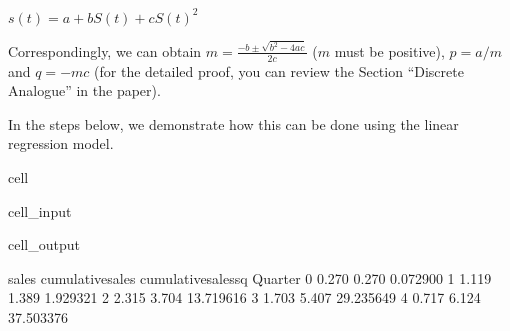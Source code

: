\documentclass[letterpaper,10pt,english]{jupyterBook}
\begin{document}
\sphinxAtStartPar
\(s(t) = a + bS(t) + cS(t)^2\)

\sphinxAtStartPar
Correspondingly, we can obtain \(m = \frac{-b \pm \sqrt{b^2-4ac}}{2c}\) (\(m\) must be positive), \(p = a/m\) and \(q = -mc\) (for the detailed proof, you can review the Section “Discrete Analogue” in the paper).

\sphinxAtStartPar
In the steps below, we demonstrate how this can be done using the linear regression model.

\begin{sphinxuseclass}{cell}\begin{sphinxVerbatimInput}

\begin{sphinxuseclass}{cell_input}
\begin{sphinxVerbatim}[commandchars=\\\{\}]
  

\PYG{p}{[}\PYG{p}{]}  \PYG{p}{[}\PYG{p}{]}
\PYG{p}{[}\PYG{p}{]}  \PYG{p}{[}\PYG{p}{]}
\PYG{p}{[}\PYG{p}{]}  \PYG{p}{[}    \PYG{p}{[}\PYG{p}{]}\PYG{p}{]}
\end{sphinxVerbatim}

\end{sphinxuseclass}\end{sphinxVerbatimInput}
\begin{sphinxVerbatimOutput}

\begin{sphinxuseclass}{cell_output}
\begin{sphinxVerbatim}[commandchars=\\\{\}]
         sales  cumulative\PYGZus{}sales  cumulative\PYGZus{}sales\PYGZus{}sq
Quarter                                              
0        0.270             0.270             0.072900
1        1.119             1.389             1.929321
2        2.315             3.704            13.719616
3        1.703             5.407            29.235649
4        0.717             6.124            37.503376
\end{sphinxVerbatim}

\end{sphinxuseclass}\end{sphinxVerbatimOutput}

\end{sphinxuseclass}
\end{document}
